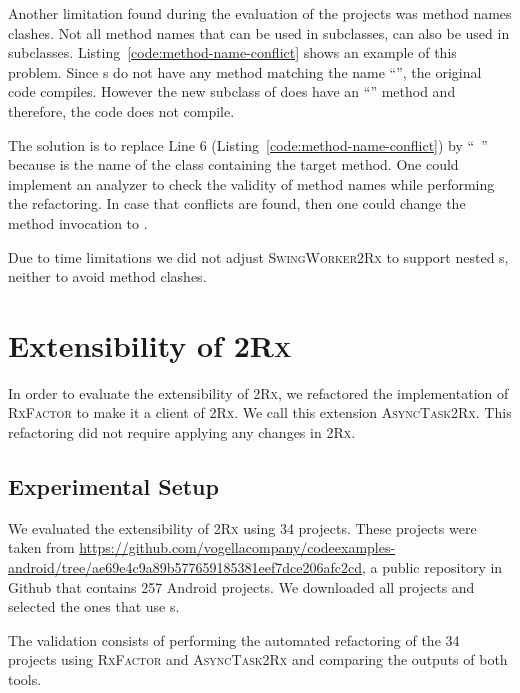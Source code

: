 \documentclass[type=bsc,accentcolor=tud9c]{tudthesis}
\newcommand{\toolcore}{\textsc{2Rx}}
\newcommand{\toolextension}{\textsc{SwingWorker2Rx}}
\newcommand{\toolrxfactor}{\textsc{AsyncTask2Rx}}
\begin{document}
Another limitation found during the evaluation of the projects was method names clashes. Not all method names that can be used in  subclasses, can also be used in  subclasses. Listing~\ref{code:method-name-conflict} shows an example of this problem. Since s do not have any method matching the name ``'', the original code compiles. However the new subclass of  does have an ``'' method and therefore, the code does not compile. 

The solution is to replace Line 6 (Listing~\ref{code:method-name-conflict}) by ``~'' because  is the name of the class containing the target method. One could implement an analyzer to check the validity of method names while performing the refactoring. In case that conflicts are found, then one could change the method invocation to .

Due to time limitations we did not adjust \toolextension{} to support nested s, neither to avoid method clashes.



\section{Extensibility of \toolcore{}}
In order to evaluate the extensibility of \toolcore{}, we refactored the implementation of \textsc{RxFactor} to make it a client of \toolcore{}. We call this extension \toolrxfactor{}. This refactoring did not require applying any changes in \toolcore{}.

\subsection{Experimental Setup}
We evaluated the extensibility of \toolcore{} using 34 projects. These projects were taken from \url{https://github.com/vogellacompany/codeexamples-android/tree/ae69e4c9a89b577659185381eef7dce206afc2cd}, a public repository in Github that contains 257 Android projects. We downloaded all projects and selected the ones that use s.

The validation consists of performing the automated refactoring of the 34 projects using \textsc{RxFactor} and \toolrxfactor{} and comparing the outputs of both tools.
\end{document}
